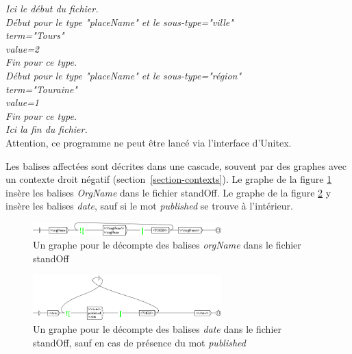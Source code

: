 \bigskip
\noindent \emph{Ici le début du fichier.}\\
\hspace*{1cm} \emph{Début pour le type "placeName" et le sous-type="ville"} \\
\hspace*{1cm} \hspace*{1cm} \emph{term="Tours"} \\
\hspace*{1cm} \hspace*{1cm} \emph{value=2} \\
\hspace*{1cm} \emph{Fin pour ce type.}\\
\hspace*{1cm} \emph{Début pour le type "placeName" et le sous-type="région"} \\
\hspace*{1cm} \hspace*{1cm} \emph{term="Touraine"} \\
\hspace*{1cm} \hspace*{1cm} \emph{value=1} \\
\hspace*{1cm} \emph{Fin pour ce type.}\\
\emph{Ici la fin du fichier.}\\

\noindent Attention, ce programme ne peut être lancé via l'interface d'Unitex.


Les balises affectées sont décrites dans une cascade, souvent par des graphes avec un contexte droit négatif (section~\ref{section-contexts}). Le graphe de la figure \ref{standOffOrgName} insère les balises \emph{OrgName} dans le fichier standOff. Le graphe de la figure \ref{standOffDate} y insère les balises \emph{date}, sauf si le mot \emph{published} se trouve à l'intérieur.


\begin{figure}[!htb]
  \centering
  \includegraphics[width=7.28cm]{resources/img/grfOrgName.png}
  \caption{Un graphe pour le décompte des balises \emph{orgName} dans le fichier standOff}
  \label{standOffOrgName}
\end{figure}


\begin{figure}[!htb]
  \centering
  \includegraphics[width=7.28cm]{resources/img/grfDate.png}
  \caption{Un graphe pour le décompte des balises \emph{date} dans le fichier standOff, sauf en cas de présence du mot \emph{published}}
  \label{standOffDate}
\end{figure}

